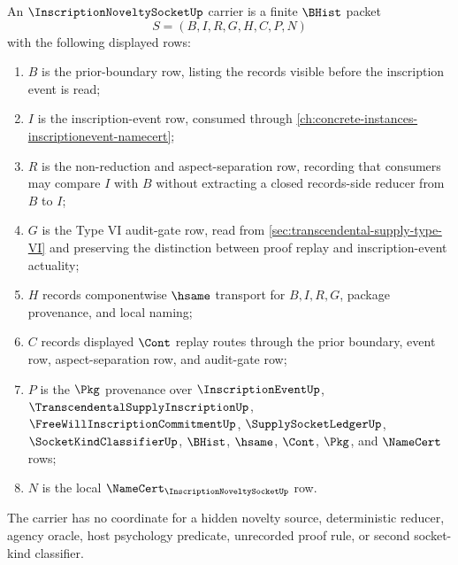 \begin{definition}
\label{def:inscription-novelty-socket-carrier}
An $\InscriptionNoveltySocketUp$ carrier is a finite $\BHist$ packet
$$
S=(B,I,R,G,H,C,P,N)
$$
with the following displayed rows:
\begin{enumerate}
\item $B$ is the prior-boundary row, listing the records visible before the inscription event is read;
\item $I$ is the inscription-event row, consumed through \autoref{ch:concrete-instances-inscriptionevent-namecert};
\item $R$ is the non-reduction and aspect-separation row, recording that consumers may compare $I$ with $B$ without extracting a closed records-side reducer from $B$ to $I$;
\item $G$ is the Type VI audit-gate row, read from \autoref{sec:transcendental-supply-type-VI} and preserving the distinction between proof replay and inscription-event actuality;
\item $H$ records componentwise $\hsame$ transport for $B,I,R,G$, package provenance, and local naming;
\item $C$ records displayed $\Cont$ replay routes through the prior boundary, event row, aspect-separation row, and audit-gate row;
\item $P$ is the $\Pkg$ provenance over $\InscriptionEventUp$, $\TranscendentalSupplyInscriptionUp$, $\FreeWillInscriptionCommitmentUp$, $\SupplySocketLedgerUp$, $\SocketKindClassifierUp$, $\BHist$, $\hsame$, $\Cont$, $\Pkg$, and $\NameCert$ rows;
\item $N$ is the local $\NameCert_{\InscriptionNoveltySocketUp}$ row.
\end{enumerate}
The carrier has no coordinate for a hidden novelty source, deterministic reducer, agency oracle, host psychology predicate, unrecorded proof rule, or second socket-kind classifier.
\end{definition}

